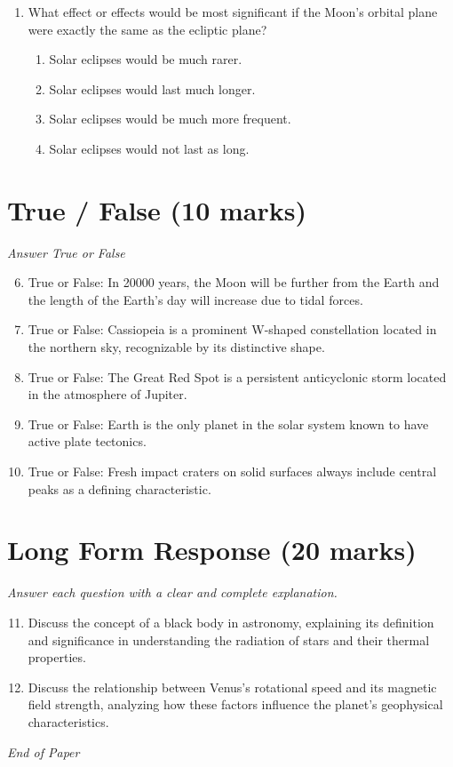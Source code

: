 \documentclass[12pt]{article}
\begin{document}
\begin{enumerate}[label=\arabic*.]
\begin{enumerate}[label=(\alph*)]
    \item They reflect enough of the sun's light to make them brighter than most background stars
    \item Asteroids have substantial motion relative to the background stars
\end{enumerate}
\item What effect or effects would be most significant if the Moon's orbital plane were exactly
the same as the ecliptic plane?
\begin{enumerate}[label=(\alph*)]
    \item Solar eclipses would be much rarer.
    \item Solar eclipses would last much longer.
    \item Solar eclipses would be much more frequent.
    \item Solar eclipses would not last as long.
\end{enumerate}
\end{enumerate}

\section*{True / False (10 marks)}
\textit{Answer True or False}
\begin{enumerate}[label=\arabic*.]
\setcounter{enumi}{5}
\item True or False: In 20000 years, the Moon will be further from the Earth and the length of the Earth's day will increase due to tidal forces.
\item True or False: Cassiopeia is a prominent W-shaped constellation located in the northern sky, recognizable by its distinctive shape.
\item True or False: The Great Red Spot is a persistent anticyclonic storm located in the atmosphere of Jupiter.
\item True or False: Earth is the only planet in the solar system known to have active plate tectonics.
\item True or False: Fresh impact craters on solid surfaces always include central peaks as a defining characteristic.
\end{enumerate}

\section*{Long Form Response (20 marks)}
\textit{Answer each question with a clear and complete explanation.}
\begin{enumerate}[label=\arabic*.]
\setcounter{enumi}{10}
\item Discuss the concept of a black body in astronomy, explaining its definition and
significance in understanding the radiation of stars and their thermal properties.
\item Discuss the relationship between Venus's rotational speed and its magnetic field strength,
analyzing how these factors influence the planet's geophysical characteristics.
\end{enumerate}

\vfill
\noindent\textit{End of Paper}
\end{document}
